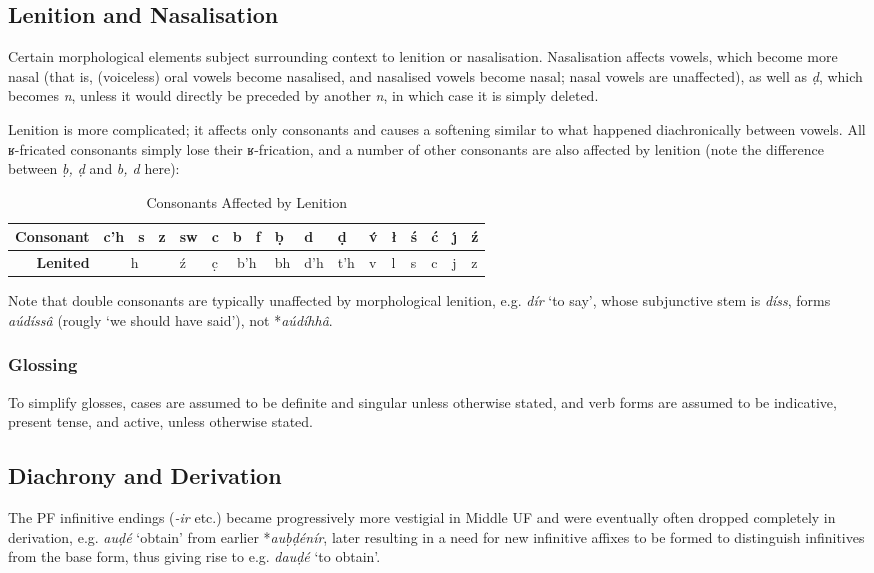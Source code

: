 \documentclass[a4paper, 12pt, twoside, final]{article}
\let \nf \normalfont
\let \w \textit
\begin{document}
\subsection{Lenition and Nasalisation}
Certain morphological elements subject surrounding context to lenition or nasalisation. Nasalisation affects vowels,
which become more nasal (that is, (voiceless) oral vowels become nasalised, and nasalised vowels become nasal; nasal
vowels are unaffected), as well as \w{ḍ}, which becomes \w{n}, unless it would directly be preceded by another \w{n}, in
which case it is simply deleted.

Lenition is more complicated; it affects only consonants and causes a softening similar to what happened diachronically
between vowels. All ʁ-fricated consonants simply lose their ʁ-frication, and a number of other consonants are also
affected by lenition (note the difference between \w{ḅ, ḍ} and \w{b, d} here):

\begin{table}[H]
\centering
\itshape
\begin{tabular}{r|lll|l|l|ll|l|l|l|l|l|l|l|l|l}
\bf Consonant & c’h & s & z & sw     & c & b & f                        & ḅ   & d   & ḍ   & v́ & ł & ś & ć & ȷ́ & ź  \\\hline
\bf Lenited & \multicolumn{3}{c|}{h} & ź & c̣ & \multicolumn{2}{c|}{b’h} & bh  & d’h & t’h & v & l & s & c & j & z \\
\end{tabular}
\nf
\caption{Consonants Affected by Lenition}\label{tab:lenition}
\end{table}

\noindent Note that double consonants are typically unaffected by morphological lenition, e.g. \w{dír} ‘to say’,
whose subjunctive stem is \w{díss}, forms \w{aúdíssâ} (rougly ‘we should have said’), not *\w{aúdíhhâ}.

\subsubsection{Glossing}
To simplify glosses, cases are assumed to be definite and singular unless otherwise stated, and verb forms are
assumed to be indicative, present tense, and active, unless otherwise stated.

\subsection{Diachrony and Derivation}\label{subsec:diachrony-and-derivation}
The PF infinitive endings (\w{-ir} etc.) became progressively more vestigial in Middle UF and were eventually
often dropped completely in derivation, e.g. \w{auḍé} ‘obtain’ from earlier *\w{auḅḍénír}, later resulting in
a need for new infinitive affixes to be formed to distinguish infinitives from the base form, thus giving
rise to e.g. \w{dauḍé} ‘to obtain’.
\end{document}

